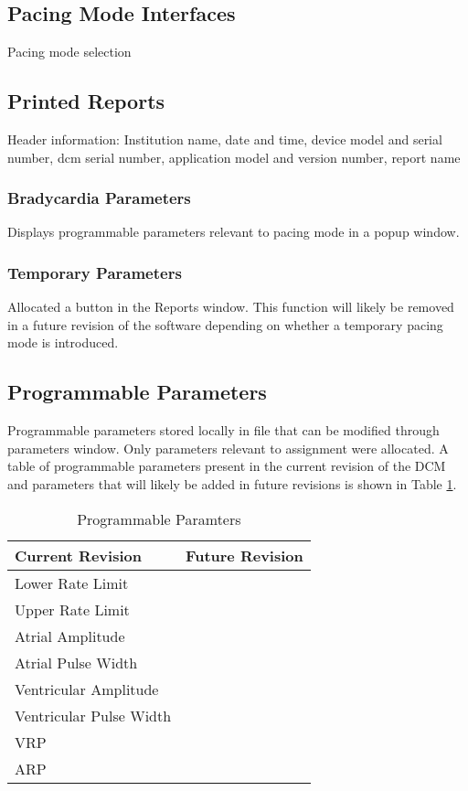 \documentclass[12pt]{article}
\begin{document}
\subsection{Pacing Mode Interfaces}
Pacing mode selection

\subsection{Printed Reports}
Header information: Institution name, date and time, device model and serial number, dcm serial number, application model and version number, report name
\subsubsection{Bradycardia Parameters}
Displays programmable parameters relevant to pacing mode in a popup window.
\subsubsection{Temporary Parameters}
Allocated a button in the Reports window. This function will likely be removed in a future revision of the software depending on whether a temporary pacing mode is introduced.

\subsection{Programmable Parameters}
Programmable parameters stored locally in file that can be modified through parameters window. Only parameters relevant to assignment were allocated. A table of programmable parameters present in the current revision of the DCM and parameters that will likely be added in future revisions is shown in Table \ref{tab:ProgrammableParams}.
\begin{table}[!ht]
\centering
\begin{tabular}{| l | l |} \hline
    Current Revision & Future Revision \\\hline
    Lower Rate Limit & \\
    Upper Rate Limit & \\
    Atrial Amplitude & \\
    Atrial Pulse Width & \\
    Ventricular Amplitude & \\
    Ventricular Pulse Width & \\
    VRP & \\
    ARP & \\\hline
\end{tabular}
\caption{\label{tab:ProgrammableParams}Programmable Paramters}
\end{table}
\end{document}
